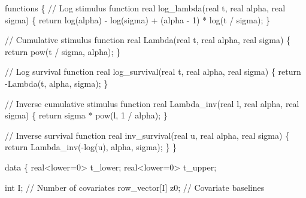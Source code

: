\documentclass[
  letterpaper,
  DIV=11,
  numbers=noendperiod]{scrartcl}
\newenvironment{Shaded}{\begin{snugshade}}{\end{snugshade}}
\newcommand{\CommentTok}[1]{\textcolor[rgb]{0.37,0.37,0.37}{#1}}
\newcommand{\ControlFlowTok}[1]{\textcolor[rgb]{0.00,0.23,0.31}{#1}}
\newcommand{\DataTypeTok}[1]{\textcolor[rgb]{0.68,0.00,0.00}{#1}}
\newcommand{\DecValTok}[1]{\textcolor[rgb]{0.68,0.00,0.00}{#1}}
\newcommand{\KeywordTok}[1]{\textcolor[rgb]{0.00,0.23,0.31}{#1}}
\newcommand{\NormalTok}[1]{\textcolor[rgb]{0.00,0.23,0.31}{#1}}
\begin{document}
\begin{codelisting}

\caption{\texttt{model4\textbackslash\_prior.stan}}

\begin{Shaded}
\begin{Highlighting}[]
\KeywordTok{functions}\NormalTok{ \{}
  \CommentTok{// Log stimulus function}
  \DataTypeTok{real}\NormalTok{ log\_lambda(}\DataTypeTok{real}\NormalTok{ t, }\DataTypeTok{real}\NormalTok{ alpha, }\DataTypeTok{real}\NormalTok{ sigma) \{}
    \ControlFlowTok{return}\NormalTok{ log(alpha) {-} log(sigma) + (alpha {-} }\DecValTok{1}\NormalTok{) * log(t / sigma);}
\NormalTok{  \}}
  
  \CommentTok{// Cumulative stimulus function}
  \DataTypeTok{real}\NormalTok{ Lambda(}\DataTypeTok{real}\NormalTok{ t, }\DataTypeTok{real}\NormalTok{ alpha, }\DataTypeTok{real}\NormalTok{ sigma) \{}
    \ControlFlowTok{return}\NormalTok{ pow(t / sigma, alpha);}
\NormalTok{  \}}

  \CommentTok{// Log survival function}
  \DataTypeTok{real}\NormalTok{ log\_survival(}\DataTypeTok{real}\NormalTok{ t, }\DataTypeTok{real}\NormalTok{ alpha, }\DataTypeTok{real}\NormalTok{ sigma) \{}
    \ControlFlowTok{return}\NormalTok{ {-}Lambda(t, alpha, sigma);}
\NormalTok{  \}}

  \CommentTok{// Inverse cumulative stimulus function}
  \DataTypeTok{real}\NormalTok{ Lambda\_inv(}\DataTypeTok{real}\NormalTok{ l, }\DataTypeTok{real}\NormalTok{ alpha, }\DataTypeTok{real}\NormalTok{ sigma) \{}
    \ControlFlowTok{return}\NormalTok{ sigma * pow(l, }\DecValTok{1}\NormalTok{ / alpha);}
\NormalTok{  \}}
  
  \CommentTok{// Inverse survival function}
  \DataTypeTok{real}\NormalTok{ inv\_survival(}\DataTypeTok{real}\NormalTok{ u, }\DataTypeTok{real}\NormalTok{ alpha, }\DataTypeTok{real}\NormalTok{ sigma) \{}
    \ControlFlowTok{return}\NormalTok{ Lambda\_inv({-}log(u), alpha, sigma);}
\NormalTok{  \}}
\NormalTok{\}}

\KeywordTok{data}\NormalTok{ \{}
  \DataTypeTok{real}\NormalTok{\textless{}}\KeywordTok{lower}\NormalTok{=}\DecValTok{0}\NormalTok{\textgreater{} t\_lower;}
  \DataTypeTok{real}\NormalTok{\textless{}}\KeywordTok{lower}\NormalTok{=}\DecValTok{0}\NormalTok{\textgreater{} t\_upper;}

  \DataTypeTok{int}\NormalTok{ I;            }\CommentTok{// Number of covariates}
  \DataTypeTok{row\_vector}\NormalTok{[I] z0; }\CommentTok{// Covariate baselines}


\end{Highlighting}
\end{Shaded}
\end{codelisting}
\end{document}
